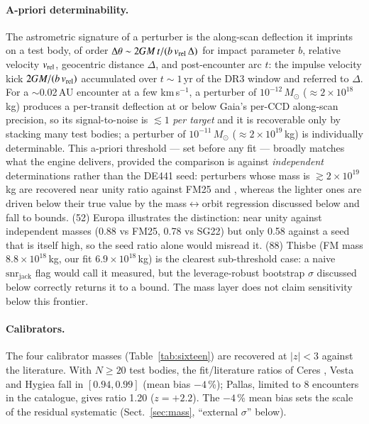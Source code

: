 \documentclass{aa}
\begin{document}
\paragraph{A-priori determinability.} The astrometric signature of a perturber
is the along-scan deflection it imprints on a test body, of order
$\Delta\theta \sim 2GM\,t/(b\,v_{\rm rel}\,\Delta)$ for impact parameter $b$,
relative velocity $v_{\rm rel}$, geocentric distance $\Delta$, and
post-encounter arc $t$: the impulse velocity kick $2GM/(b\,v_{\rm rel})$
accumulated over $t\sim1$\,yr of the DR3 window and referred to $\Delta$. For a
$\sim$0.02\,AU encounter at a few km\,s$^{-1}$, a perturber of
$10^{-12}\,M_\odot$ ($\approx2\times10^{18}$\,kg) produces a per-transit
deflection at or below Gaia's per-CCD along-scan precision, so its
signal-to-noise is $\lesssim1$ \emph{per target} and it is recoverable only by
stacking many test bodies; a perturber of $10^{-11}\,M_\odot$
($\approx2\times10^{19}$\,kg) is individually determinable. This a-priori
threshold --- set before any fit --- broadly matches what the engine delivers,
provided the comparison is against \emph{independent} determinations rather than
the DE441 seed: perturbers whose mass is $\gtrsim2\times10^{19}$\,kg are
recovered near unity ratio against FM25 and \citet{siltala2022}, whereas the
lighter ones are driven below their true value by the mass$\leftrightarrow$orbit
regression discussed below and fall to bounds. (52) Europa illustrates the
distinction: near unity against independent masses (0.88 vs FM25, 0.78 vs SG22)
but only 0.58 against a seed that is itself high, so the seed ratio alone would
misread it. (88) Thisbe (FM mass $8.8\times10^{18}$\,kg, our fit
$6.9\times10^{18}$\,kg) is the clearest sub-threshold case: a naive
$\mathrm{snr_{jack}}$ flag would call it measured, but the leverage-robust
bootstrap $\sigma$ discussed below correctly returns it to a bound. The mass
layer does not claim sensitivity below this frontier.

\paragraph{Calibrators.} The four calibrator masses (Table~\ref{tab:sixteen})
are recovered at $|z|<3$ against the literature. With $N\geq20$ test bodies, the
fit/literature ratios of Ceres \citep{park2016}, Vesta
\citep[DAWN;][]{russell2012} and Hygiea \citep{vernazza2020} fall in
$[0.94, 0.99]$ (mean bias $-4$\,\%); Pallas, limited to 8 encounters in the
catalogue, gives ratio 1.20 ($z=+2.2$). The $-4$\,\% mean bias sets the scale of
the residual systematic (Sect.~\ref{sec:mass}, ``external $\sigma$'' below).
\end{document}
